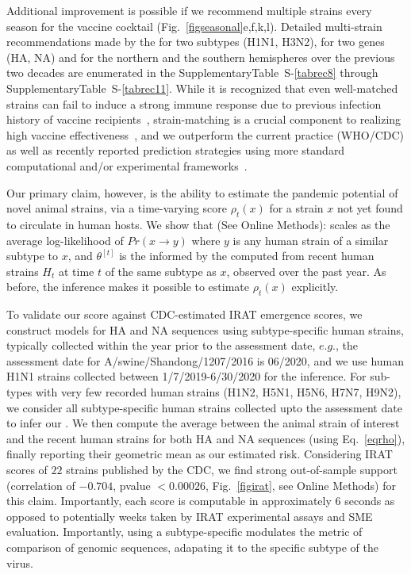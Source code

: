 \documentclass[onecolumn, compsoc,10pt]{IEEEtran}
\def\SUPPLEMENTARY{Supplementary}
\def\METHODS{Online Methods\xspace}
\begin{document}
Additional improvement is possible if we recommend multiple strains every season for the vaccine cocktail (Fig.~\ref{figseasonal}e,f,k,l). Detailed  multi-strain recommendations made by the \enet  for two subtypes (H1N1, H3N2), for two genes (HA, NA) and for the northern and the southern hemispheres over the previous two decades are enumerated in the \SUPPLEMENTARY  Table~S-\ref{tabrec8} through \SUPPLEMENTARY Table~S-\ref{tabrec11}. While it is recognized that even well-matched strains can fail to induce a strong immune response due to previous infection history of vaccine recipients~\cite{cobey2018poor}, strain-matching is a crucial component to realizing high vaccine effectiveness~\cite{gouma2020antigenic}, and we  outperform the current practice (WHO/CDC) as well as  recently reported prediction strategies  using more standard computational and/or experimental frameworks~\cite{huddleston2020integrating,neher2014predicting}.


Our primary claim, however,  is the ability to estimate the pandemic potential of novel animal strains, via a  time-varying \erisk score $\rho_t(x)$ for a strain $x$ not yet found to circulate in human hosts. We show that (See \METHODS):%
%
scales as the average log-likelihood of $Pr(x \rightarrow y)$ where $y$ is any human strain of a similar subtype to $x$, and  $\theta^{[t]}$ is the \qdist informed by the \enet computed from recent human strains $H_t$ at time $t$ of the same subtype as $x$, observed over the past year. As before, the \enet inference makes it possible to estimate $\rho_t(x)$ explicitly. 

To validate our score against CDC-estimated IRAT emergence scores, we construct \enet models for HA and NA sequences using subtype-specific human strains, typically collected within the  year prior to the assessment date, $e.g.$,  the  assessment date for A/swine/Shandong/1207/2016 is 06/2020, and  we  use human H1N1 strains collected  between 1/7/2019-6/30/2020 for the \enet inference. For sub-types with very few recorded human strains (H1N2, H5N1, H5N6, H7N7, H9N2), we consider all subtype-specific human strains collected upto the  assessment date  to infer our \enet. We then compute the average \qdist between the animal  strain of interest  and the recent human strains for both HA and NA sequences (using Eq.~\eqref{eqrho}),  finally reporting their geometric mean as our estimated risk. Considering IRAT scores of $22$ strains published by the CDC, we find strong out-of-sample support  (correlation of $-0.704$, pvalue $< 0.00026$, Fig.~\ref{figirat}, see \METHODS) for this claim. Importantly, each \erisk score  is  computable in approximately $6$ seconds as opposed to potentially weeks taken by IRAT experimental assays and SME evaluation. Importantly,  using a  subtype-specific \enet modulates the  metric of comparison of genomic sequences, adapating it to the specific subtype of the virus.
\end{document}
